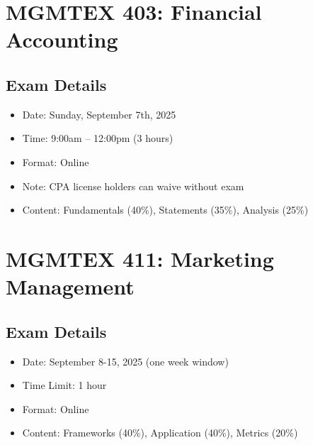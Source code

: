 \documentclass[11pt]{article}
\begin{document}
\newpage
\section{MGMTEX 403: Financial Accounting}
\subsection{Exam Details}
\begin{itemize}
\item Date: Sunday, September 7th, 2025
\item Time: 9:00am – 12:00pm (3 hours)
\item Format: Online
\item Note: CPA license holders can waive without exam
\item Content: Fundamentals (40\%), Statements (35\%), Analysis (25\%)
\end{itemize}


\newpage
\section{MGMTEX 411: Marketing Management}
\subsection{Exam Details}
\begin{itemize}
\item Date: September 8-15, 2025 (one week window)
\item Time Limit: 1 hour
\item Format: Online
\item Content: Frameworks (40\%), Application (40\%), Metrics (20\%)
\end{itemize}

\end{document}

